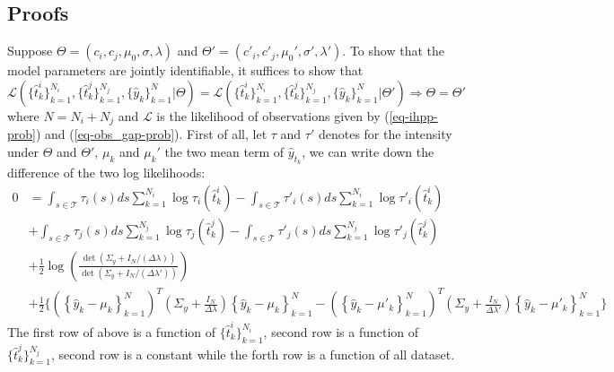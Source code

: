 \documentclass[mnsc]{informs3}
\begin{document}
\newpage
\begin{APPENDICES}


\section{Proofs}

Suppose $\Theta = (c_i, c_j, \mu_0, \sigma, \lambda)$ and $\Theta' = (c'_i, c'_j, \mu_0', \sigma', \lambda')$. 
To show that the model parameters are jointly identifiable, it suffices to show that 
\begin{equation*}
\mathcal{L}(\{\hat{t}^i_k\}_{k=1}^{N_i}, \{\hat{t}^j_k\}_{k=1}^{N_j}, \{\hat{y}_k\}_{k=1}^{N} | \Theta) = \mathcal{L}(\{\hat{t}^i_k\}_{k=1}^{N_i}, \{\hat{t}^j_k\}_{k=1}^{N_j}, \{\hat{y}_k\}_{k=1}^{N} | \Theta')
\Rightarrow
\Theta = \Theta'
\end{equation*}
where $N = N_i+N_j$ and $\mathcal{L}$ is the likelihood of observations given by (\ref{eq-ihpp-prob}) and (\ref{eq-obs_gap-prob}). 
First of all, let $\tau$ and $\tau'$ denotes for the intensity under $\Theta$ and $\Theta'$, $\mu_k$ and $\mu_k'$ the two mean term of $\hat{y}_{t_k}$,
we can write down the difference of the two log likelihoods:
\begin{equation*}
\begin{aligned}
0 &= \int_{s\in\mathcal{T}}\tau_i(s)ds \sum^{N_i}_{k=1}\log\tau_i(\hat{t}^i_k) - \int_{s\in\mathcal{T}}\tau'_i(s)ds \sum^{N_i}_{k=1}\log\tau'_i(\hat{t}^i_k) \\
&+ \int_{s\in\mathcal{T}}\tau_j(s)ds \sum^{N_j}_{k=1}\log\tau_j(\hat{t}^j_k) - \int_{s\in\mathcal{T}}\tau'_j(s)ds \sum^{N_j}_{k=1}\log\tau'_j(\hat{t}^j_k) \\ 
&+ \frac{1}{2}\log\left(\frac{\det\left(\Sigma_y+I_N/(\Delta \lambda)\right)}{\det\left(\Sigma_y+I_N/(\Delta\lambda')\right)}\right) \\
&+ \frac{1}{2}\Bigg\{\left(\left\{\hat{y}_k - \mu_k\right\}^{N}_{k=1}\right)^T\left(\Sigma_y+\frac{I_N}{\Delta\lambda}\right)\left\{\hat{y}_k - \mu_k\right\}^{N}_{k=1}
- \left(\left\{\hat{y}_k - \mu'_k\right\}^{N}_{k=1}\right)^T\left(\Sigma_y+\frac{I_N}{\Delta\lambda'}\right)\left\{\hat{y}_k - \mu'_k\right\}^{N}_{k=1}\Bigg\}
\end{aligned}
\end{equation*}
The first row of above is a function of $\{\hat{t}^i_k\}_{k=1}^{N_i}$, second row is a function of $\{\hat{t}^j_k\}_{k=1}^{N_j}$, second row is a constant while the forth row is a function of all dataset. 


\end{APPENDICES}
\end{document}
